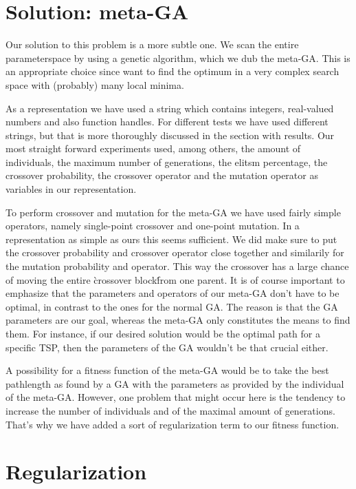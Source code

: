 \documentclass[a4paper]{article}
\begin{document}
\section{Solution: meta-GA}

Our solution to this problem is a more subtle one. We scan the entire parameterspace by using a genetic algorithm, which we dub the meta-GA. This is an appropriate choice since want to find the optimum in a very complex search space with (probably) many local minima. 
\par
As a representation we have used a string which contains integers, real-valued numbers and also function handles. For different tests we have used different strings, but that is more thoroughly discussed in the section with results. Our most straight forward experiments used, among others, the amount of individuals, the maximum number of generations, the elitsm percentage, the crossover probability, the crossover operator and the mutation operator as variables in our representation.
\par
To perform crossover and mutation for the meta-GA we have used fairly simple operators, namely single-point crossover and one-point mutation. In a representation as simple as ours this seems sufficient. We did make sure to put the crossover probability and crossover operator close together and similarily for the mutation probability and operator. This way the crossover has a large chance of moving the entire \`crossover block\' from one parent. It is of course important to emphasize that the parameters and operators of our meta-GA don't have to be optimal, in contrast to the ones for the normal GA. The reason is that the GA parameters are our goal, whereas the meta-GA only constitutes the means to find them. For instance, if our desired solution would be the optimal path for a specific TSP, then the parameters of the GA wouldn't be that crucial either.
\par
A possibility for a fitness function of the meta-GA would be to take the best pathlength as found by a GA with the parameters as provided by the individual of the meta-GA. However, one problem that might occur here is the tendency to increase the number of individuals and of the maximal amount of generations. That's why we have added a sort of regularization term to our fitness function.

\section{Regularization}
\end{document}
